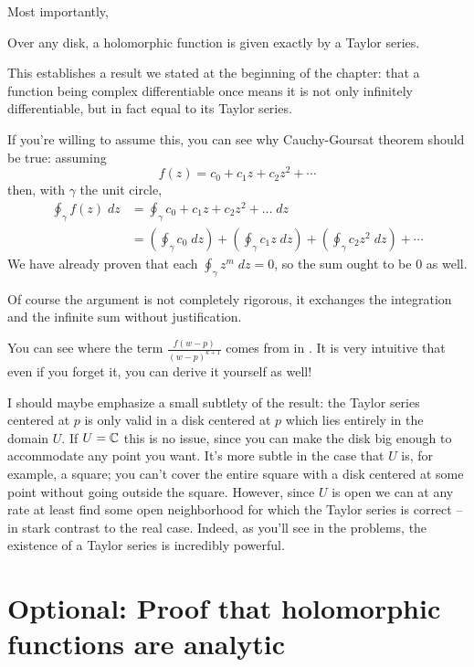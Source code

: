 Most importantly,
\begin{moral}
	Over any disk,
	a holomorphic function is given
	exactly by a Taylor series.
\end{moral}
This establishes a result we stated at the beginning of the chapter:
that a function being complex differentiable once means it is not only infinitely differentiable,
but in fact equal to its Taylor series.

\begin{remark}
	If you're willing to assume this, you can see why Cauchy-Goursat theorem should be true:
	assuming
	\[
		f(z) = c_0 + c_1 z + c_2 z^2 + \cdots
	\]
	then, with $\gamma$ the unit circle,
	\begin{align*}
		\oint_\gamma f(z) \; dz
		&= \oint_\gamma c_0 + c_1 z + c_2 z^2 + \dots \; dz \\
		&= \left( \oint_\gamma c_0 \; dz \right) +
		\left( \oint_\gamma c_1 z \; dz \right) +
		\left( \oint_\gamma c_2 z^2 \; dz \right) + \cdots
	\end{align*}
	We have already proven that each $\oint_\gamma z^m \; dz = 0$, so the sum ought to be $0$ as
	well.

	Of course the argument is not completely rigorous, it exchanges the integration and the
	infinite sum without justification.
\end{remark}

\begin{remark}
	You can see where the term $\frac{f(w-p)}{(w-p)^{k+1}}$ comes from in
	. It is very intuitive that even if you forget it,
	you can derive it yourself as well!
\end{remark}

I should maybe emphasize a small subtlety of the result:
the Taylor series centered at $p$ is only valid in a disk centered at $p$ which lies entirely in the domain $U$.
If $U = \mathbb C$ this is no issue, since you can make the disk big enough to accommodate any point you want.
It's more subtle in the case that $U$ is, for example, a square; you can't cover the entire square
with a disk centered at some point without going outside the square.
However, since $U$ is open we can at any rate at least find some
open neighborhood for which the Taylor
series is correct -- in stark contrast to the real case.
Indeed, as you'll see in the problems,
the existence of a Taylor series is incredibly powerful.

\section{Optional: Proof that holomorphic functions are analytic}

